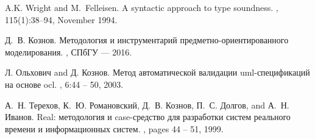 \begin{thebibliography}{10}
A.K. Wright and M.~Felleisen.
\newblock A syntactic approach to type soundness.
, 115(1):38--94, November 1994.

Д.~В. Кознов.
\newblock Методология и инструментарий
  предметно-ориентированного
  моделирования.
, СПбГУ
  --- 2016.

Л. Ольхович and Д. Кознов.
\newblock Метод автоматической валидации
  uml-спецификаций на основе ocl.
, 6:44 -- 50, 2003.

А.~Н. Терехов, К.~Ю. Романовский, Д.~В. Кознов,
  П.~С. Долгов, and А.~Н. Иванов.
\newblock Real: методология и case-средство для
  разработки систем реального времени и
  информационных систем.
, pages 44 -- 51, 1999.

\end{thebibliography}
